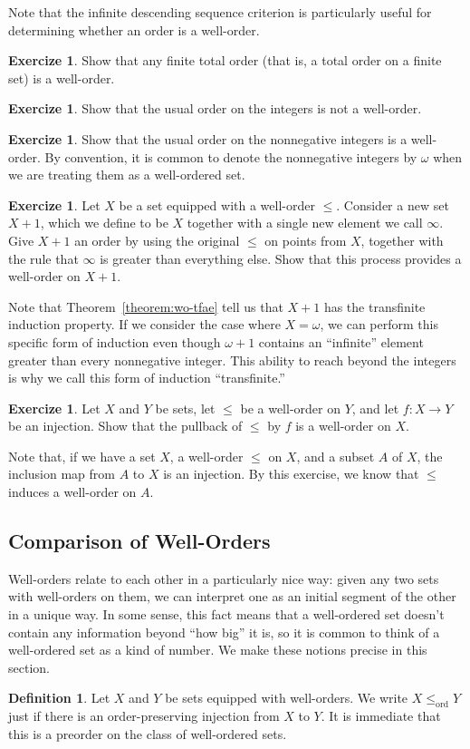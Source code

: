 \documentclass[letterpaper]{article}
\theoremstyle{definition}
\newtheorem{definition}[theorem]{Definition}
\newtheorem{exercise}[theorem]{Exercize}
\newcommand{\orderembeds}{\leq_{\mathrm{ord}}}
\begin{document}
Note that the infinite descending sequence criterion is particularly
useful for determining whether an order is a well-order.
\begin{exercise}
  Show that any finite total order (that is, a total order on a finite
  set) is a well-order.
\end{exercise}
\begin{exercise}
  Show that the usual order on the integers is not a well-order.
\end{exercise}
\begin{exercise}
  Show that the usual order on the nonnegative integers is a
  well-order.  By convention, it is common to denote the nonnegative
  integers by \(\omega\) when we are treating them as a well-ordered
  set.
\end{exercise}
\begin{exercise}
  Let \(X\) be a set equipped with a well-order \(\leq\).  Consider a
  new set \(X+1\), which we define to be \(X\) together with a single
  new element we call \(\infty\).  Give \(X+1\) an order by using the
  original \(\leq\) on points from \(X\), together with the rule that
  \(\infty\) is greater than everything else.  Show that this process
  provides a well-order on \(X+1\).

  Note that Theorem~\ref{theorem:wo-tfae} tell us that \(X+1\) has the
  transfinite induction property.  If we consider the case where \(X =
  \omega\), we can perform this specific form of induction even though
  \(\omega+1\) contains an ``infinite'' element greater than every
  nonnegative integer.  This ability to reach beyond the integers is
  why we call this form of induction ``transfinite.''
\end{exercise}
\begin{exercise}
  Let \(X\) and \(Y\) be sets, let \(\leq\) be a well-order on \(Y\),
  and let \(f:X \to Y\) be an injection.  Show that the pullback of
  \(\leq\) by \(f\) is a well-order on \(X\).

  Note that, if we have a set \(X\), a well-order \(\leq\) on \(X\),
  and a subset \(A\) of \(X\), the inclusion map from \(A\) to \(X\)
  is an injection.  By this exercise, we know that \(\leq\) induces a
  well-order on \(A\).
\end{exercise}

\subsection{Comparison of Well-Orders}
Well-orders relate to each other in a particularly nice way: given any
two sets with well-orders on them, we can interpret one as an initial
segment of the other in a unique way.  In some sense, this fact means
that a well-ordered set doesn't contain any information beyond ``how
big'' it is, so it is common to think of a well-ordered set as a kind
of number.  We make these notions precise in this section.

\begin{definition}
  Let \(X\) and \(Y\) be sets equipped with well-orders.  We write \(X
  \orderembeds Y\) just if there is an order-preserving injection from
  \(X\) to \(Y\).  It is immediate that this is a preorder on the
  class of well-ordered sets.
\end{definition}
\end{document}
